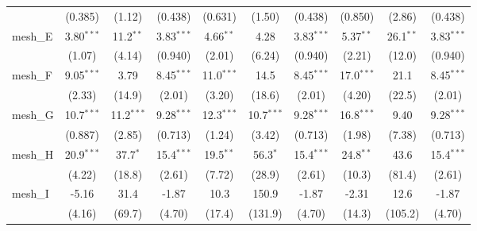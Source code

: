 \begin{tabular}{lccccccccc}
                                                               & (0.385)       & (1.12)        & (0.438)       & (0.631)       & (1.50)         & (0.438)       & (0.850)       & (2.86)         & (0.438)\\   
   mesh\_E                                                     & 3.80$^{***}$  & 11.2$^{**}$   & 3.83$^{***}$  & 4.66$^{**}$   & 4.28           & 3.83$^{***}$  & 5.37$^{**}$   & 26.1$^{**}$    & 3.83$^{***}$\\   
                                                               & (1.07)        & (4.14)        & (0.940)       & (2.01)        & (6.24)         & (0.940)       & (2.21)        & (12.0)         & (0.940)\\   
   mesh\_F                                                     & 9.05$^{***}$  & 3.79          & 8.45$^{***}$  & 11.0$^{***}$  & 14.5           & 8.45$^{***}$  & 17.0$^{***}$  & 21.1           & 8.45$^{***}$\\   
                                                               & (2.33)        & (14.9)        & (2.01)        & (3.20)        & (18.6)         & (2.01)        & (4.20)        & (22.5)         & (2.01)\\   
   mesh\_G                                                     & 10.7$^{***}$  & 11.2$^{***}$  & 9.28$^{***}$  & 12.3$^{***}$  & 10.7$^{***}$   & 9.28$^{***}$  & 16.8$^{***}$  & 9.40           & 9.28$^{***}$\\   
                                                               & (0.887)       & (2.85)        & (0.713)       & (1.24)        & (3.42)         & (0.713)       & (1.98)        & (7.38)         & (0.713)\\   
   mesh\_H                                                     & 20.9$^{***}$  & 37.7$^{*}$    & 15.4$^{***}$  & 19.5$^{**}$   & 56.3$^{*}$     & 15.4$^{***}$  & 24.8$^{**}$   & 43.6           & 15.4$^{***}$\\   
                                                               & (4.22)        & (18.8)        & (2.61)        & (7.72)        & (28.9)         & (2.61)        & (10.3)        & (81.4)         & (2.61)\\   
   mesh\_I                                                     & -5.16         & 31.4          & -1.87         & 10.3          & 150.9          & -1.87         & -2.31         & 12.6           & -1.87\\   
                                                               & (4.16)        & (69.7)        & (4.70)        & (17.4)        & (131.9)        & (4.70)        & (14.3)        & (105.2)        & (4.70)\\   

\end{tabular}
